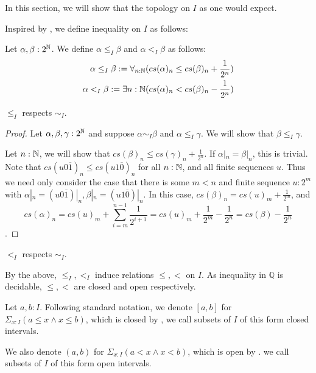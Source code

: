 In this section, we will show that the topology on $I$ as one would expect. 

Inspired by \Cite{Bishop}, we define inequality on $I$ as follows:
\begin{definition}
  Let $\alpha,\beta:2^{\mathbb{N}}$. 
  We define $\alpha\leq_I \beta$ and $\alpha<_I\beta$ as follows:
  \begin{align}
  \alpha\leq_I\beta : = \forall_{n:\mathbb{N}} ( cs(\alpha)_n \leq cs(\beta)_n + \frac {1} {2^n})\\ 
    \alpha   <_I \beta : = \exists{n:\mathbb{N}} ( cs(\alpha)_n < cs(\beta)_n - \frac {1} {2^n})
\end{align}
\end{definition}

\begin{lemma}
  $\leq_I$ respects $\sim_I$. 
\end{lemma}
\begin{proof}
  Let $\alpha,\beta,\gamma:2^{\mathbb{N}}$ and suppose $\alpha\sim_I\beta$ and $\alpha \leq_I\gamma$.
  We will show that $\beta\leq_I\gamma$. 
  
  Let $n:\mathbb{N}$, we will show that $cs(\beta)_n \leq cs(\gamma)_n + \frac{1}{2^n}$. 
  If $\alpha|_n = \beta|_n$, this is trivial.
  Note that $cs (u 0 \overline 1)_n \leq  cs( u 1 \overline 0)_n$ for all $n:\mathbb{N}$, and all finite sequences $u$. 
  Thus we need only consider the case that there is some $m<n$ and finite sequence $u:2^m$ with 
  $\alpha|_n = (u 0 \overline 1)|_n, \beta|_n = (u 1 \overline 0)|_n$.
  In this case, 
  $cs(\beta)_n = cs(u)_m + \frac 1 {2^m}$, 
  and 
  $$cs(\alpha)_n = 
                   cs (u)_m + \sum_{i = m}^{n-1} \frac 1 {2^{i+1}} 
                   = cs(u)_m + \frac 1 {2^m} - \frac{1}{2^n}
                 = cs(\beta) - \frac{1} {2^n}
  $$.

  
  


\end{proof}
\begin{lemma}
  $<_I$ respects $\sim_I$. 
\end{lemma} 

\begin{remark}
  By the above, $\leq_I, <_I$ induce relations $\leq,<$ on $I$.
  As inequality in $\mathbb Q$ is decidable, $\leq, <$ are closed and open respectively. 

  Let $a,b:I$. Following standard notation, we denote
  $[a,b]$ for $\Sigma_{x:I} (a\leq x \wedge x \leq b)$, which is closed by , 
  we call subsets of $I$ of this form closed intervals. 


  We also denote $(a,b)$ for $\Sigma_{x:I} (a < x \wedge x < b)$, which is open by .
  we call subsets of $I$ of this form open intervals. 
\end{remark}

